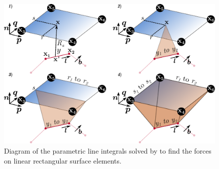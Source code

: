\documentclass[11pt]{iopart}
\begin{document}
\begin{figure}[htb]
    \centering
    \includegraphics[width=0.8\linewidth]{images/force_calc_linear_rectangle.pdf}
    \caption{Diagram of the parametric line integrals solved by \citet{Queyreau} to find the forces on linear rectangular surface elements.}
    \label{f:force_lin_rect}
\end{figure}
%
\end{document}
